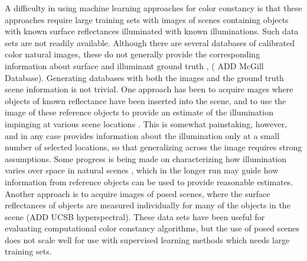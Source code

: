 \documentclass{jov}
\begin{document}
A difficulty in using machine learning approaches for color constancy is that these approaches require large training sets with images of scenes containing objects with known surface reflectances illuminated with known illuminations.  Such data sets are not readily available. Although there are several databases of calibrated color natural images, these do not generally provide the corresponding information about surface and illuminant ground truth \cite{ChakrabartiHyperspectral,NascimentoFoster2016,ParragaHyperspectralData,TkacikUpennHypersepctralData,skauli2013collection},  ( ADD McGill Database). Generating databases with both the images and the ground truth scene information is not trivial. One approach has been to acquire mages where objects of known reflectance have been inserted into the scene, and to use the image of these reference objects to provide an estimate of the illumination impinging at various scene locations \cite{NascimentoFoster2016}.  This is somewhat painstaking, however, and in any case provides information about the illumination only at a small number of selected locations, so that generalizing across the image requires strong assumptions. Some progress is being made on characterizing how illumination varies over space in natural scenes \cite{mury2007spatial}, which in the longer run may guide how information from reference objects can be used to provide reasonable estimates.  Another approach is to acquire images of posed scenes, where the surface reflectances of objects are measured individually for many of the objects in the scene \cite{funt1988color,ciurea2003large} (ADD UCSB hyperspectral). These data sets have been useful for evaluating computational color constancy algorithms, but the use of posed scenes does not scale well for use with supervised learning methods which needs large training sets. 
 
\end{document}
